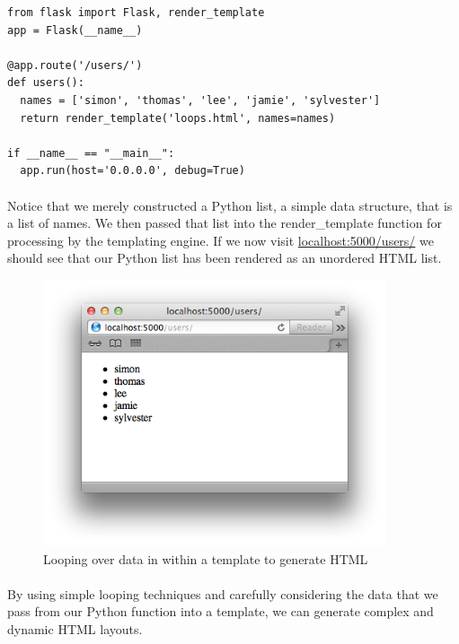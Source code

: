 \documentclass[12pt, a4paper, twoside]{book}
\begin{document}
\begin{lstlisting}
from flask import Flask, render_template
app = Flask(__name__)

@app.route('/users/')
def users():
  names = ['simon', 'thomas', 'lee', 'jamie', 'sylvester']
  return render_template('loops.html', names=names)

if __name__ == "__main__":
  app.run(host='0.0.0.0', debug=True)
\end{lstlisting}

\paragraph{} Notice that we merely constructed a Python list, a simple data structure, that is a list of names. We then passed that list into the render\_template function for processing by the templating engine. If we now visit \url{localhost:5000/users/} we should see that our Python list has been rendered as an unordered HTML list.

\begin{figure}[H]
\centering
\includegraphics[width=0.9\textwidth]{images/flask-templates-loops}
\caption{Looping over data in within a template to generate HTML}
\label{fig:flask-templates-loops}
\end{figure}

\paragraph{} By using simple looping techniques and carefully considering the data that we pass from our Python function into a template, we can generate complex and dynamic HTML layouts.
\end{document}
